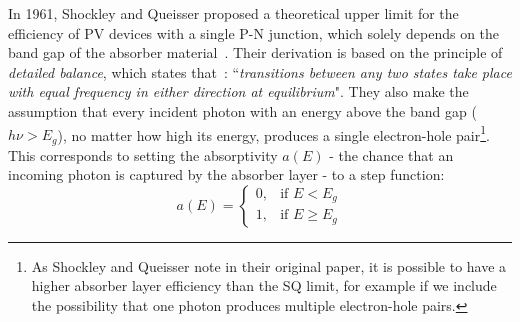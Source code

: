 \begin{refsection}
In 1961, Shockley and Queisser proposed a theoretical upper limit for the 
efficiency of PV devices with a single P-N junction, which solely depends on 
the band gap of the absorber material~\cite{Shockley1949}. Their derivation is 
based on the principle of \textit{detailed balance}, which states 
that~\cite{Klein1955}: ``\textit{transitions between any two states take place 
with equal frequency in either direction at equilibrium}". They also make the 
assumption that every incident photon with an energy above the band gap ($h\nu 
> E_g$), no matter how high its energy, produces a single electron-hole 
pair\footnote{As Shockley and Queisser note in their original paper, it is 
possible to have a higher absorber layer efficiency than the SQ limit, for 
example if we include the possibility that one photon produces multiple 
electron-hole pairs.}. This corresponds to setting the absorptivity $a(E)$ - 
the chance that an incoming photon is captured by the absorber layer - to a 
step function: 
\begin{equation}\label{slme:eq-step_a} 
a(E) =  \begin{cases} 0, & \mbox{if } E < E_g \\ 1, & \mbox{if } E \geq E_g 
\end{cases} 
\end{equation} 
 

\end{refsection}
